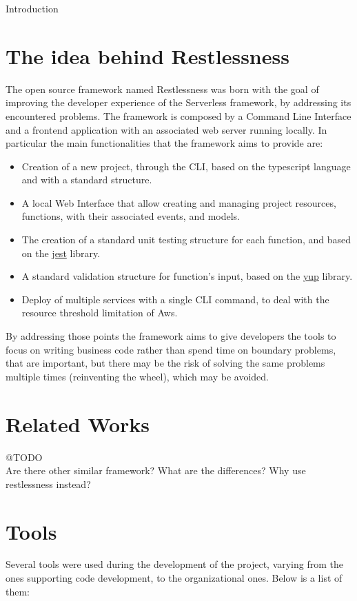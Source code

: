 \begin{chapter}{Introduction}
    \section{The idea behind Restlessness}
    The open source framework named Restlessness was born with the goal of improving
    the developer experience of the Serverless framework, by addressing its encountered
    problems.
    The framework is composed by a Command Line Interface and a frontend application
    with an associated web server running locally.
    In particular the main functionalities that the framework aims to provide are:
    \begin{itemize}
        \item Creation of a new project, through the CLI, based on the typescript
            language and with a standard structure.
        \item A local Web Interface that allow creating and managing project resources,
            functions, with their associated events, and models.
        \item The creation of a standard unit testing structure for each function,
            and based on the \href{https://www.npmjs.com/package/jest}{jest} library.
        \item A standard validation structure for function's input, based on the
            \href{https://www.npmjs.com/package/yup}{yup} library.
        \item Deploy of multiple services with a single CLI command, to deal with
            the resource threshold limitation of Aws.
    \end{itemize}

    By addressing those points the framework aims to give developers the tools to
    focus on writing business code rather than spend time on boundary problems,
    that are important, but there may be the risk of solving the same problems
    multiple times (reinventing the wheel), which may be avoided.

    \section{Related Works}
    @TODO\\
    Are there other similar framework? What are the differences? Why use restlessness instead?

    \section{Tools}
    Several tools were used during the development of the project, varying from the ones supporting
    code development, to the organizational ones. Below is a list of them:


\end{chapter}
